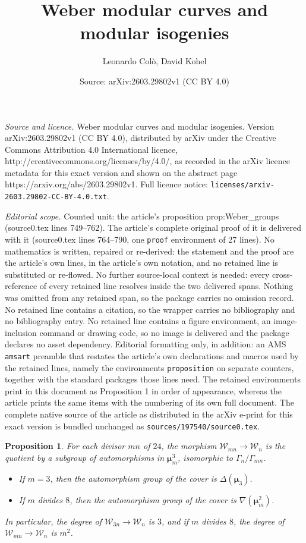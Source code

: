 \documentclass[10pt,a4paper]{amsart}
\title{Weber modular curves and modular isogenies}
\author{Leonardo Col\`o, David Kohel}
\date{Source: arXiv:2603.29802v1 (CC BY 4.0)}
\newtheorem{proposition}{Proposition}
\newcommand{\cW}{\mathcal{W}}
\newcommand{\isom}{\cong}
\newcommand{\mmu}{\boldsymbol{\mu}}
\begin{document}
\maketitle

\noindent\emph{Source and licence.} Weber modular curves and modular isogenies. Version arXiv:2603.29802v1 (CC BY 4.0), distributed by arXiv under the Creative Commons Attribution 4.0 International licence, http://creativecommons.org/licenses/by/4.0/, as recorded in the arXiv licence metadata for this exact version and shown on the abstract page https://arxiv.org/abs/2603.29802v1. Full licence notice: \texttt{licenses/arxiv-2603.29802-CC-BY-4.0.txt}.\par\smallskip

\noindent\textit{Editorial scope.} Counted unit: the article's proposition prop:Weber\_groups (source0.tex lines 749--762). The article's complete original proof of it is delivered with it (source0.tex lines 764--790, one \texttt{proof} environment of 27 lines). No mathematics is written, repaired or re-derived: the statement and the proof are the article's own lines, in the article's own notation, and no retained line is substituted or re-flowed.  No further source-local context is needed: every cross-reference of every retained line resolves inside the two delivered spans.  Nothing was omitted from any retained span, so the package carries no omission record.  No retained line contains a citation, so the wrapper carries no bibliography and no bibliography entry.  No retained line contains a figure environment, an image-inclusion command or drawing code, so no image is delivered and the package declares no asset dependency.  Editorial formatting only, in addition: an AMS \texttt{amsart} preamble that restates the article's own declarations and macros used by the retained lines, namely the environments \texttt{proposition} on separate counters, together with the standard packages those lines need.  The retained environments print in this document as Proposition 1 in order of appearance, whereas the article prints the same items with the numbering of its own full document.  The complete native source of the article as distributed in the arXiv e-print for this exact version is bundled unchanged as \texttt{sources/197540/source0.tex}.
\begin{proposition}
  \label{prop:Weber_groups}
  For each divisor $mn$ of $24$, the morphism $\cW_{mn} \to \cW_n$ is the quotient by
  a subgroup of automorphisms in $\mmu_m^3$, isomorphic to $\Gamma_{n}/\Gamma_{mn}$.
  \begin{itemize}
  \item
    If $m = 3$, then the automorphism group of the cover is $\Delta(\mmu_3)$. %
  \item
    If $m$ divides $8$, then the automorphism group of the
    cover is $\nabla(\mmu_m^2)$. %
  \end{itemize}
  In particular, the degree of $\cW_{3n} \rightarrow \cW_n$ is $3$, and if $m$ divides $8$,
  the degree of $\cW_{mn} \rightarrow \cW_n$ is $m^2$.
\end{proposition}
\end{document}
